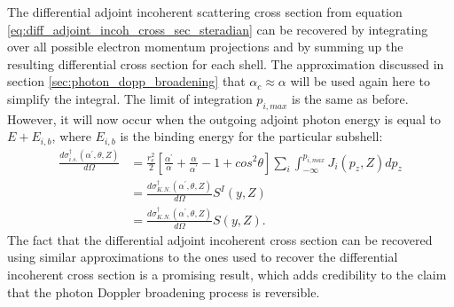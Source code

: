 The differential adjoint incoherent scattering cross section from equation
\ref{eq:diff_adjoint_incoh_cross_sec_steradian} can be recovered by integrating
over all possible electron momentum projections and by summing up the resulting
differential cross section for each shell. The approximation discussed in
section \ref{sec:photon_dopp_broadening} that $\alpha_c \approx \alpha$ will
be used again here to simplify the integral. The limit of integration
$p_{i,max}$ is the same as before. However, it will now occur when the outgoing
adjoint photon energy is equal to $E+E_{i,b}$, where $E_{i,b}$ is the binding
energy for the particular subshell:
\begin{align}
  \frac{d\sigma_{i.s.}^{\dagger}(\alpha^{'},\theta,Z)}{d\Omega} & = 
  \frac{r_e^2}{2}\left[\frac{\alpha^{'}}{\alpha} + \frac{\alpha}{\alpha^{'}} - 1
    + cos^2\theta \right] \sum_i \int_{-\infty}^{p_{i,max}} J_i(p_z,Z)dp_z \nonumber\\
  & = \frac{d\sigma_{K.N.}^{\dagger}(\alpha^{'},\theta,Z)}{d\Omega} S^I(y,Z) 
  \nonumber \\
  & = \frac{d\sigma_{K.N.}^{\dagger}(\alpha^{'},\theta,Z)}{d\Omega} S(y,Z).
  \nonumber
\end{align}
The fact that the differential adjoint incoherent cross section can be recovered
using similar approximations to the ones used to recover the differential 
incoherent cross section is a promising result, which adds credibility to the
claim that the photon Doppler broadening process is reversible. 

